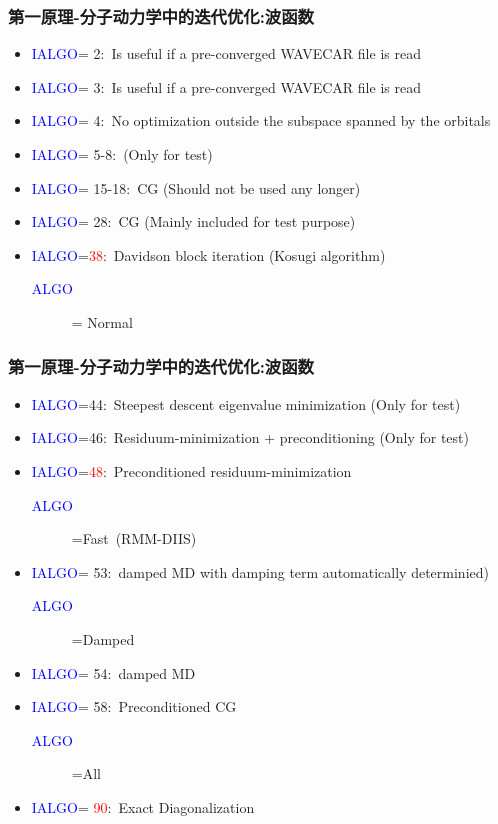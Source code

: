 \documentclass[cjk,slidestop,compress,mathserif,blue]{beamer}
\begin{document}
   \frame
   {
	   \frametitle{第一原理-分子动力学中的迭代优化:波函数}
	\begin{itemize}
		\item \textcolor{blue}{IALGO}= \textrm{2}:~\textrm{Is useful if a pre-converged WAVECAR file is read}
		\item \textcolor{blue}{IALGO}= \textrm{3}:~\textrm{Is useful if a pre-converged WAVECAR file is read}
		\item \textcolor{blue}{IALGO}= \textrm{4}:~\textrm{No optimization outside the subspace spanned by the orbitals}
		\item \textcolor{blue}{IALGO}= \textrm{5-8}:~\textrm{(Only for test)}
		\item \textcolor{blue}{IALGO}= \textrm{15-18}:~\textrm{CG} (\textrm{Should not be used any longer})
		\item \textcolor{blue}{IALGO}= \textrm{28}:~\textrm{CG} (\textrm{Mainly included for test purpose})
		\item \textcolor{blue}{IALGO}=\textcolor{red}{\textrm{38}}:~\textrm{Davidson block iteration} (\textrm{Kosugi algorithm})
			\begin{description}
				\item[\textcolor{blue}{ALGO}] = \textrm{Normal}
			\end{description}
	\end{itemize}
   }

   \frame
   {
	   \frametitle{第一原理-分子动力学中的迭代优化:波函数}
	\begin{itemize}
		\item \textcolor{blue}{IALGO}=\textrm{44}:~\textrm{Steepest descent eigenvalue minimization} \textrm{(Only for test)}
		\item \textcolor{blue}{IALGO}=\textrm{46}:~\textrm{Residuum-minimization + preconditioning} \textrm{(Only for test)}
		\item \textcolor{blue}{IALGO}=\textcolor{red}{\textrm{48}}:~\textrm{Preconditioned residuum-minimization}
			\begin{description}
				\item[\textcolor{blue}{ALGO}]=\textrm{Fast~{(RMM-DIIS)}}
			\end{description}
		\item \textcolor{blue}{IALGO}= \textrm{53}:~\textrm{damped MD with damping term automatically determinied)}
			\begin{description}
				\item[\textcolor{blue}{ALGO}]=\textrm{Damped} 
			\end{description}
		\item \textcolor{blue}{IALGO}= \textrm{54}:~\textrm{damped MD}
		\item \textcolor{blue}{IALGO}= \textrm{58}:~\textrm{Preconditioned CG}
			\begin{description}
				\item[\textcolor{blue}{ALGO}]=\textrm{All} 
			\end{description}
		\item \textcolor{blue}{IALGO}= \textcolor{red}{\textrm{90}}:~\textrm{Exact Diagonalization}
	\end{itemize}
   }
\end{document}
